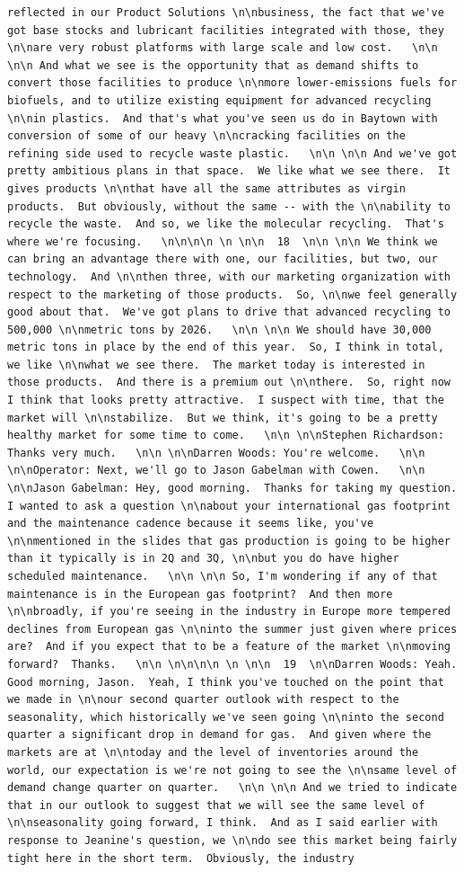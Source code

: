 \documentclass[
  letterpaper,
  DIV=11,
  numbers=noendperiod]{scrreprt}
\begin{document}
\begin{verbatim}
reflected in our Product Solutions \n\nbusiness, the fact that we've got base stocks and lubricant facilities integrated with those, they \n\nare very robust platforms with large scale and low cost.   \n\n \n\n And what we see is the opportunity that as demand shifts to convert those facilities to produce \n\nmore lower-emissions fuels for biofuels, and to utilize existing equipment for advanced recycling \n\nin plastics.  And that's what you've seen us do in Baytown with conversion of some of our heavy \n\ncracking facilities on the refining side used to recycle waste plastic.   \n\n \n\n And we've got pretty ambitious plans in that space.  We like what we see there.  It gives products \n\nthat have all the same attributes as virgin products.  But obviously, without the same -- with the \n\nability to recycle the waste.  And so, we like the molecular recycling.  That's where we're focusing.   \n\n\n\n \n \n\n  18  \n\n \n\n We think we can bring an advantage there with one, our facilities, but two, our technology.  And \n\nthen three, with our marketing organization with respect to the marketing of those products.  So, \n\nwe feel generally good about that.  We've got plans to drive that advanced recycling to 500,000 \n\nmetric tons by 2026.   \n\n \n\n We should have 30,000 metric tons in place by the end of this year.  So, I think in total, we like \n\nwhat we see there.  The market today is interested in those products.  And there is a premium out \n\nthere.  So, right now I think that looks pretty attractive.  I suspect with time, that the market will \n\nstabilize.  But we think, it's going to be a pretty healthy market for some time to come.   \n\n \n\nStephen Richardson: Thanks very much.   \n\n \n\nDarren Woods: You're welcome.   \n\n \n\nOperator: Next, we'll go to Jason Gabelman with Cowen.   \n\n \n\nJason Gabelman: Hey, good morning.  Thanks for taking my question.  I wanted to ask a question \n\nabout your international gas footprint and the maintenance cadence because it seems like, you've \n\nmentioned in the slides that gas production is going to be higher than it typically is in 2Q and 3Q, \n\nbut you do have higher scheduled maintenance.   \n\n \n\n So, I'm wondering if any of that maintenance is in the European gas footprint?  And then more \n\nbroadly, if you're seeing in the industry in Europe more tempered declines from European gas \n\ninto the summer just given where prices are?  And if you expect that to be a feature of the market \n\nmoving forward?  Thanks.   \n\n \n\n\n\n \n \n\n  19  \n\nDarren Woods: Yeah.  Good morning, Jason.  Yeah, I think you've touched on the point that we made in \n\nour second quarter outlook with respect to the seasonality, which historically we've seen going \n\ninto the second quarter a significant drop in demand for gas.  And given where the markets are at \n\ntoday and the level of inventories around the world, our expectation is we're not going to see the \n\nsame level of demand change quarter on quarter.   \n\n \n\n And we tried to indicate that in our outlook to suggest that we will see the same level of \n\nseasonality going forward, I think.  And as I said earlier with response to Jeanine's question, we \n\ndo see this market being fairly tight here in the short term.  Obviously, the industry 
\end{verbatim}
\end{document}
